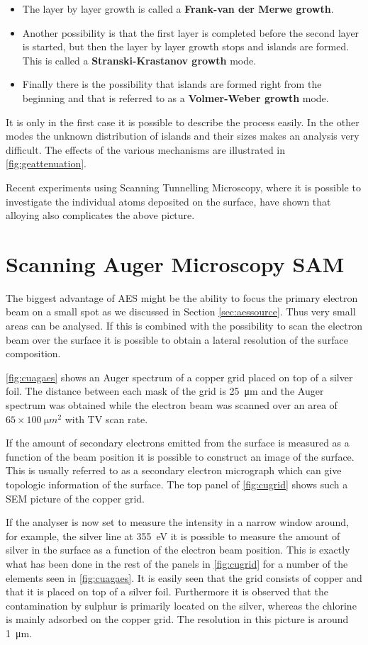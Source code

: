 \begin{itemize}
\item The layer by layer growth is called a {\bf Frank-van der Merwe growth}.
\item Another possibility is that the first layer is completed before the second layer is started, but then the layer by layer growth stops and islands are formed. This is called a {\bf Stranski-Krastanov growth} mode.
\item Finally there is the possibility that islands are formed right from the beginning and that is referred to as a {\bf Volmer-Weber growth} mode.
\end{itemize}

It is only in the first case it is possible to describe the process easily. In the other modes the unknown distribution of islands and their sizes makes an analysis very difficult. The effects of the various mechanisms are illustrated in \autoref{fig:geattenuation}.

Recent experiments using Scanning Tunnelling Microscopy, where it is possible to investigate the individual atoms deposited on the surface, have shown that alloying also complicates the above picture.

\section{Scanning Auger Microscopy SAM}
The biggest advantage of AES might be the ability to focus the primary electron beam on a small spot as we discussed in Section  \ref{sec:aessource}. Thus very small areas can be analysed. If this is combined with the possibility to scan the electron beam over the surface it is possible to obtain a lateral resolution of the surface composition.

\autoref{fig:cuagaes} shows an Auger spectrum of a copper grid placed on top of a silver foil. The distance between each mask of the grid is \SI{25}{\micro m} and the Auger spectrum was obtained while the electron beam was scanned over an area of $65\times\SI{100}{\micro m^2}$ with TV scan rate.

If the amount of secondary electrons emitted  from the surface is measured as a function of the beam position it is possible to construct an image of the surface. This is usually referred to as a secondary electron micrograph which can give topologic information of the surface. The top panel of \autoref{fig:cugrid} shows such a SEM picture of the copper grid.

If the analyser is now set to measure the intensity in a narrow window around, for example, the silver line at \SI{355}{\electronvolt} it is possible to measure the amount of silver in the surface as a function of the electron beam position. This is exactly what has been done in the rest of the panels in \autoref{fig:cugrid} for a number of the elements seen in \autoref{fig:cuagaes}. It is easily seen that the grid consists of copper and that it is placed on top of a silver foil. Furthermore it is observed that the contamination by sulphur is primarily located on the silver, whereas the chlorine is mainly adsorbed on the copper grid. The resolution in this picture is around \SI{1}{\micro m}.

